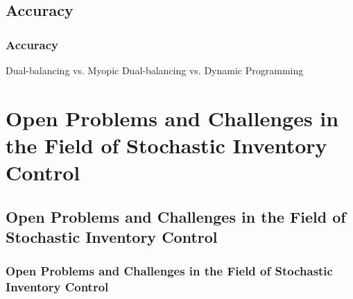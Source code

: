 \documentclass{beamer}
\begin{document}
    \subsection{Accuracy}
    \begin{frame}
    \frametitle{Accuracy}
    Dual-balancing vs. Myopic
    Dual-balancing vs. Dynamic Programming
    \end{frame}
  \section{Open Problems and Challenges in the Field of Stochastic Inventory Control}
    \subsection{Open Problems and Challenges in the Field of Stochastic Inventory Control}
    \begin{frame}
    \frametitle{Open Problems and Challenges in the Field of Stochastic Inventory Control}

    \end{frame}
\end{document}
